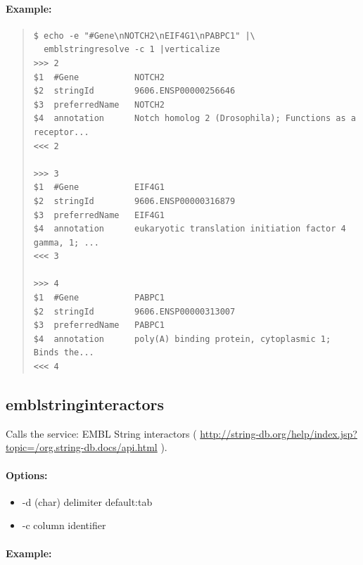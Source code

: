 \documentclass[12pt]{article}
\begin{document}
\paragraph{Example:}


\begin{quote}
\begin{verbatim}
$ echo -e "#Gene\nNOTCH2\nEIF4G1\nPABPC1" |\
  emblstringresolve -c 1 |verticalize 
>>>	2
$1	#Gene        	NOTCH2
$2	stringId     	9606.ENSP00000256646
$3	preferredName	NOTCH2
$4	annotation   	Notch homolog 2 (Drosophila); Functions as a receptor...
<<<	2

>>>	3
$1	#Gene        	EIF4G1
$2	stringId     	9606.ENSP00000316879
$3	preferredName	EIF4G1
$4	annotation   	eukaryotic translation initiation factor 4 gamma, 1; ...
<<<	3

>>>	4
$1	#Gene        	PABPC1
$2	stringId     	9606.ENSP00000313007
$3	preferredName	PABPC1
$4	annotation   	poly(A) binding protein, cytoplasmic 1; Binds the...
<<<	4
\end{verbatim}
\end{quote}


\subsection{emblstringinteractors}
Calls the service: EMBL String interactors ( \url{http://string-db.org/help/index.jsp?topic=/org.string-db.docs/api.html} ).


\paragraph{Options:}
\begin{itemize}
\item-d (char) delimiter default:tab
\item-c column identifier
\end{itemize}
\paragraph{Example:}
\end{document}
